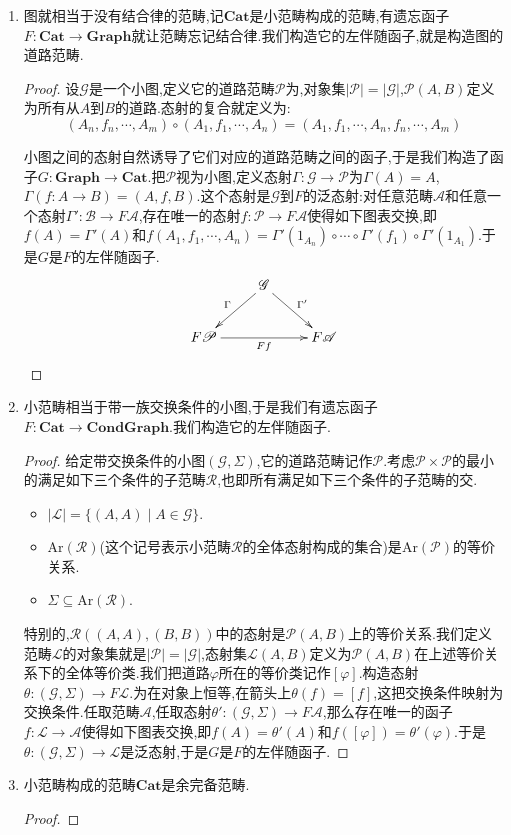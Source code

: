 \begin{enumerate}
	\item 图就相当于没有结合律的范畴,记$\textbf{Cat}$是小范畴构成的范畴,有遗忘函子$F:\textbf{Cat}\to\textbf{Graph}$就让范畴忘记结合律.我们构造它的左伴随函子,就是构造图的道路范畴.
	\begin{proof}
		
		设$\mathscr{G}$是一个小图,定义它的道路范畴$\mathscr{P}$为,对象集$|\mathscr{P}|=|\mathscr{G}|$,$\mathscr{P}(A,B)$定义为所有从$A$到$B$的道路.态射的复合就定义为:
		$$(A_n,f_n,\cdots,A_m)\circ(A_1,f_1,\cdots,A_n)=(A_1,f_1,\cdots,A_n,f_n,\cdots,A_m)$$
		
		小图之间的态射自然诱导了它们对应的道路范畴之间的函子,于是我们构造了函子$G:\textbf{Graph}\to\textbf{Cat}$.把$\mathscr{P}$视为小图,定义态射$\Gamma:\mathscr{G}\to\mathscr{P}$为$\Gamma(A)=A$,$\Gamma(f:A\to B)=(A,f,B)$.这个态射是$\mathscr{G}$到$F$的泛态射:对任意范畴$\mathscr{A}$和任意一个态射$\Gamma':\mathscr{B}\to F\mathscr{A}$,存在唯一的态射$f:\mathscr{P}\to F\mathscr{A}$使得如下图表交换,即$f(A)=\Gamma'(A)$和$f(A_1,f_1,\cdots,A_n)=\Gamma'(1_{A_n})\circ\cdots\circ\Gamma'(f_1)\circ\Gamma'(1_{A_1})$.于是$G$是$F$的左伴随函子.
		$$\xymatrix{&\mathscr{G}\ar[dl]_{\Gamma}\ar[dr]^{\Gamma'}&\\F\mathscr{P}\ar[rr]_{Ff}&&F\mathscr{A}}$$
	\end{proof}
    \item 小范畴相当于带一族交换条件的小图,于是我们有遗忘函子$F:\textbf{Cat}\to\textbf{CondGraph}$.我们构造它的左伴随函子.
    \begin{proof}
    	
    	给定带交换条件的小图$(\mathscr{G},\Sigma)$,它的道路范畴记作$\mathscr{P}$.考虑$\mathscr{P}\times\mathscr{P}$的最小的满足如下三个条件的子范畴$\mathscr{R}$,也即所有满足如下三个条件的子范畴的交.
    	\begin{itemize}
    		\item $|\mathscr{L}|=\{(A,A)\mid A\in\mathscr{G}\}$.
    		\item $\mathrm{Ar}(\mathscr{R})$(这个记号表示小范畴$\mathscr{R}$的全体态射构成的集合)是$\mathrm{Ar}(\mathscr{P})$的等价关系.
    		\item $\Sigma\subseteq\mathrm{Ar}(\mathscr{R})$.
    	\end{itemize}
    	
    	特别的,$\mathscr{R}((A,A),(B,B))$中的态射是$\mathscr{P}(A,B)$上的等价关系.我们定义范畴$\mathscr{L}$的对象集就是$|\mathscr{P}|=|\mathscr{G}|$,态射集$\mathscr{L}(A,B)$定义为$\mathscr{P}(A,B)$在上述等价关系下的全体等价类.我们把道路$\varphi$所在的等价类记作$[\varphi]$.构造态射$\theta:(\mathscr{G},\Sigma)\to F\mathscr{L}$.为在对象上恒等,在箭头上$\theta(f)=[f]$,这把交换条件映射为交换条件.任取范畴$\mathscr{A}$,任取态射$\theta':(\mathscr{G},\Sigma)\to F\mathscr{A}$,那么存在唯一的函子$f:\mathscr{L}\to\mathscr{A}$使得如下图表交换,即$f(A)=\theta'(A)$和$f([\varphi])=\theta'(\varphi)$.于是$\theta:(\mathscr{G},\Sigma)\to\mathscr{L}$是泛态射,于是$G$是$F$的左伴随函子.
    \end{proof}
    \item 小范畴构成的范畴$\textbf{Cat}$是余完备范畴.
    \begin{proof}
    	

\end{proof}
\end{enumerate}
